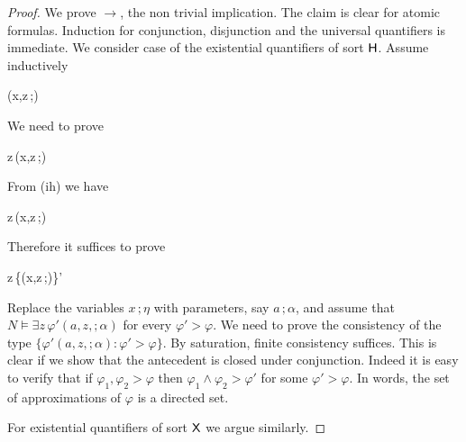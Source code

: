 \documentclass{amsproc}
\begin{document}
\begin{proof}
  We prove $\rightarrow$, the non trivial implication.
  The claim is clear for atomic formulas.
  Induction for conjunction, disjunction and the universal quantifiers is immediate.
%
%
%
%
%
  We consider case of the existential quantifiers of sort ${\sf H}$.
  Assume inductively
  
  {\rightarrow}
  {\varphi(x,z\,;\eta)}

  We need to prove

  {\rightarrow}
  {\exists z\,\varphi(x,z\,;\eta)}

  From (ih) we have

  {\rightarrow}
  {\exists z\,\varphi(x,z\,;\eta)}

  Therefore it suffices to prove

  {\rightarrow}
  {\exists z\,\{\varphi(x,z\,;\eta)\}'}

Replace the variables $x\,;\eta$ with parameters, say $a\,;\alpha$, and assume that $N\models\exists z\,\varphi'(a,z,;\alpha)$ for every $\varphi'>\varphi$.
We need to prove the consistency of the type $\{\varphi'(a,z,;\alpha):\varphi'>\varphi\}$.
By saturation, finite consistency suffices.
This is clear if we show that the antecedent is closed under conjunction.
Indeed it is easy to verify that if $\varphi_1,\varphi_2>\varphi$ then $\varphi_1\wedge\varphi_2>\varphi'$ for some $\varphi'>\varphi$.
In words, the set of approximations of $\varphi$ is a directed set.

For existential quantifiers of sort ${\sf X}$ we argue similarly.%
%
%
%
%
%
\end{proof}
\end{document}
